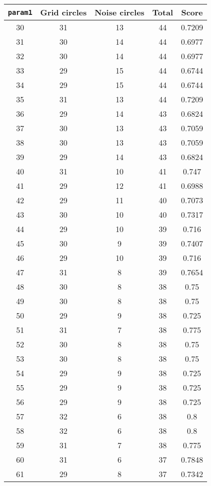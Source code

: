 \documentclass[letterpaper, 12pt]{article}
\begin{document}
\begin{longtable}{|c|c|c|c|c|}
\hline
\textbf{\texttt{param1}} & \textbf{Grid circles} & \textbf{Noise circles} & \textbf{Total} & \textbf{Score} \\
\hline
30 & 31 & 13 & 44 & 0.7209 \\
\hline
31 & 30 & 14 & 44 & 0.6977 \\
\hline
32 & 30 & 14 & 44 & 0.6977 \\
\hline
33 & 29 & 15 & 44 & 0.6744 \\
\hline
34 & 29 & 15 & 44 & 0.6744 \\
\hline
35 & 31 & 13 & 44 & 0.7209 \\
\hline
36 & 29 & 14 & 43 & 0.6824 \\
\hline
37 & 30 & 13 & 43 & 0.7059 \\
\hline
38 & 30 & 13 & 43 & 0.7059 \\
\hline
39 & 29 & 14 & 43 & 0.6824 \\
\hline
40 & 31 & 10 & 41 & 0.747 \\
\hline
41 & 29 & 12 & 41 & 0.6988 \\
\hline
42 & 29 & 11 & 40 & 0.7073 \\
\hline
43 & 30 & 10 & 40 & 0.7317 \\
\hline
44 & 29 & 10 & 39 & 0.716 \\
\hline
45 & 30 & 9 & 39 & 0.7407 \\
\hline
46 & 29 & 10 & 39 & 0.716 \\
\hline
47 & 31 & 8 & 39 & 0.7654 \\
\hline
48 & 30 & 8 & 38 & 0.75 \\
\hline
49 & 30 & 8 & 38 & 0.75 \\
\hline
50 & 29 & 9 & 38 & 0.725 \\
\hline
51 & 31 & 7 & 38 & 0.775 \\
\hline
52 & 30 & 8 & 38 & 0.75 \\
\hline
53 & 30 & 8 & 38 & 0.75 \\
\hline
54 & 29 & 9 & 38 & 0.725 \\
\hline
55 & 29 & 9 & 38 & 0.725 \\
\hline
56 & 29 & 9 & 38 & 0.725 \\
\hline
57 & 32 & 6 & 38 & 0.8 \\
\hline
58 & 32 & 6 & 38 & 0.8 \\
\hline
59 & 31 & 7 & 38 & 0.775 \\
\hline
60 & 31 & 6 & 37 & 0.7848 \\
\hline
61 & 29 & 8 & 37 & 0.7342 \\

\end{longtable}
\end{document}
